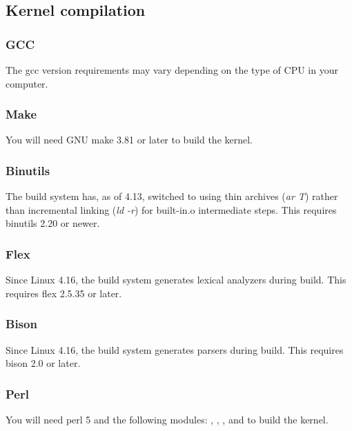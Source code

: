 \documentclass[a4paper,8pt,english]{sphinxmanual}
\begin{document}

\subsection{Kernel compilation}
\label{process/changes:kernel-compilation}

\subsubsection{GCC}
\label{process/changes:gcc}
The gcc version requirements may vary depending on the type of CPU in your
computer.


\subsubsection{Make}
\label{process/changes:make}
You will need GNU make 3.81 or later to build the kernel.


\subsubsection{Binutils}
\label{process/changes:binutils}
The build system has, as of 4.13, switched to using thin archives (\emph{ar T})
rather than incremental linking (\emph{ld -r}) for built-in.o intermediate steps.
This requires binutils 2.20 or newer.


\subsubsection{Flex}
\label{process/changes:flex}
Since Linux 4.16, the build system generates lexical analyzers
during build.  This requires flex 2.5.35 or later.


\subsubsection{Bison}
\label{process/changes:bison}
Since Linux 4.16, the build system generates parsers
during build.  This requires bison 2.0 or later.


\subsubsection{Perl}
\label{process/changes:perl}
You will need perl 5 and the following modules: ,
, , and  to build the kernel.
\end{document}
